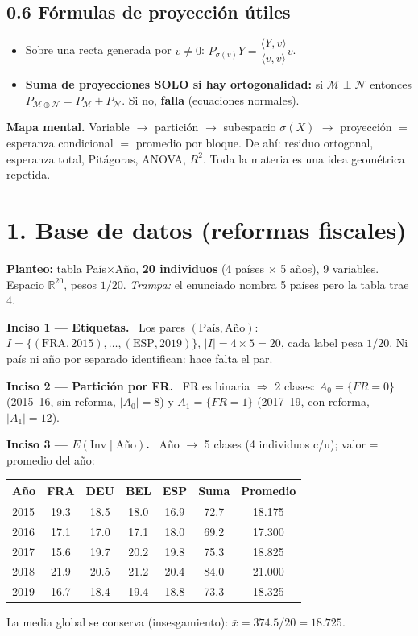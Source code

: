 \documentclass[11pt]{article}
\newcommand{\R}{\mathbb{R}}
\newcommand{\sg}{\sigma}
\newcommand{\inc}[1]{\smallskip\noindent\textbf{\color{blue!30!black}#1}\ }
\begin{document}
\subsection*{0.6 Fórmulas de proyección útiles}
\begin{itemize}[leftmargin=1.4em,itemsep=1pt]
\item Sobre una recta generada por $v\neq0$: $P_{\sg(v)}Y=\dfrac{\langle Y,v\rangle}{\langle v,v\rangle}v$.
\item \textbf{Suma de proyecciones SOLO si hay ortogonalidad:} si $\mathcal M\perp\mathcal N$ entonces
$P_{\mathcal M\oplus\mathcal N}=P_{\mathcal M}+P_{\mathcal N}$. Si no, \textbf{falla} (ecuaciones normales).
\end{itemize}
\begin{keybox}\small
\textbf{Mapa mental.} Variable $\to$ partición $\to$ subespacio $\sg(X)$ $\to$ proyección $=$
esperanza condicional $=$ promedio por bloque. De ahí: residuo ortogonal, esperanza total, Pitágoras,
ANOVA, $R^2$. Toda la materia es una idea geométrica repetida.
\end{keybox}

\section*{1. Base de datos (reformas fiscales)}
\textbf{Planteo:} tabla País$\times$Año, \textbf{20 individuos} (4 países $\times$ 5 años), 9 variables.
Espacio $\R^{20}$, pesos $1/20$. \emph{Trampa:} el enunciado nombra 5 países pero la tabla trae 4.

\inc{Inciso 1 — Etiquetas.} Los pares $(\text{País},\text{Año})$:
$I=\{(\mathrm{FRA},2015),\dots,(\mathrm{ESP},2019)\}$, $|I|=4\times5=20$, cada label pesa $1/20$.
Ni país ni año por separado identifican: hace falta el par.

\inc{Inciso 2 — Partición por FR.} FR es binaria $\Rightarrow$ 2 clases:
$A_0=\{FR=0\}$ (2015--16, sin reforma, $|A_0|=8$) y $A_1=\{FR=1\}$ (2017--19, con reforma, $|A_1|=12$).

\inc{Inciso 3 — $E(\text{Inv}\mid\text{Año})$.} Año $\to$ 5 clases (4 individuos c/u); valor = promedio del año:
\begin{center}\small
\begin{tabular}{@{}lcccccc@{}}
\toprule
Año & FRA & DEU & BEL & ESP & Suma & Promedio\\\midrule
2015 & 19.3 & 18.5 & 18.0 & 16.9 & 72.7 & 18.175\\
2016 & 17.1 & 17.0 & 17.1 & 18.0 & 69.2 & 17.300\\
2017 & 15.6 & 19.7 & 20.2 & 19.8 & 75.3 & 18.825\\
2018 & 21.9 & 20.5 & 21.2 & 20.4 & 84.0 & 21.000\\
2019 & 16.7 & 18.4 & 19.4 & 18.8 & 73.3 & 18.325\\\bottomrule
\end{tabular}
\end{center}
La media global se conserva (insesgamiento): $\bar x=374.5/20=18.725$.
\end{document}
